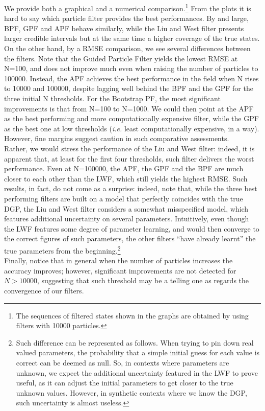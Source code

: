 \documentclass[
]{book}
\theoremstyle{break}
\theoremstyle{nonumberplain}
\begin{document}
We provide both a graphical and a numerical
comparison.\footnote{The sequences of filtered states shown in the graphs are obtained by using filters with 10000 particles.}
From the plots it is hard to say which particle filter provides the best
performances. By and large, BPF, GPF and APF behave similarly, while the
Liu and West filter presents larger credible intervals but at the same
time a higher coverage of the true states.\\
On the other hand, by a RMSE comparison, we see several differences
between the filters. Note that the Guided Particle Filter yields the
lowest RMSE at N=100, and does not improve much even when raising the
number of particles to 100000. Instead, the APF achieves the best
performance in the field when N rises to 10000 and 100000, despite
lagging well behind the BPF and the GPF for the three initial N
thresholds. For the Bootstrap PF, the most significant improvements is
that from N=100 to N=1000. We could then point at the APF as the best
performing and more computationally expensive filter, while the GPF as
the best one at low thresholds (\textit{i.e.} least computationally
expensive, in a way). However, fine margins suggest caution in such
comparative assessments.\\
Rather, we would stress the performance of the Liu and West filter:
indeed, it is apparent that, at least for the first four thresholds,
such filter delivers the worst performance. Even at N=100000, the APF,
the GPF and the BPF are much closer to each other than the LWF, which
still yields the highest RMSE. Such results, in fact, do not come as a
surprise: indeed, note that, while the three best performing filters are
built on a model that perfectly coincides with the true DGP, the Liu and
West filter considers a somewhat misspecified model, which features
additional uncertainty on several parameters. Intuitively, even though
the LWF features some degree of parameter learning, and would then
converge to the correct figures of such parameters, the other filters
``have already learnt'' the true parameters from the
beginning.\footnote{Such difference can be represented as follows. When trying to pin down real valued parameters, the probability that a simple initial guess for each value is correct can be deemed as null. So, in contexts where parameters are unknown, we expect the additional uncertainty featured in the LWF to prove useful, as it can adjust the initial parameters to get closer to the true unknown values. However, in synthetic contexts where we know the DGP, such uncertainty is almost useless.}\\
Finally, notice that in general when the number of particles increases
the accuracy improves; however, significant improvements are not
detected for \(N>10000\), suggesting that such threshold may be a
telling one as regards the convergence of our filters.
\end{document}
